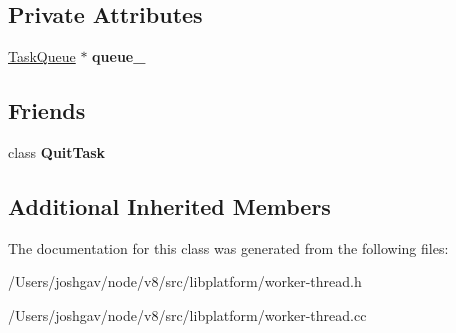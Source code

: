\subsection*{Private Attributes}
\begin{DoxyCompactItemize}
\item 
\hyperlink{classv8_1_1platform_1_1_task_queue}{Task\+Queue} $\ast$ {\bfseries queue\+\_\+}\hypertarget{classv8_1_1platform_1_1_worker_thread_ac917d7f4d0eba3d10201abacdbde1b68}{}\label{classv8_1_1platform_1_1_worker_thread_ac917d7f4d0eba3d10201abacdbde1b68}

\end{DoxyCompactItemize}
\subsection*{Friends}
\begin{DoxyCompactItemize}
\item 
class {\bfseries Quit\+Task}\hypertarget{classv8_1_1platform_1_1_worker_thread_a371c4e877b93059aff86d43d63c8d70c}{}\label{classv8_1_1platform_1_1_worker_thread_a371c4e877b93059aff86d43d63c8d70c}

\end{DoxyCompactItemize}
\subsection*{Additional Inherited Members}


The documentation for this class was generated from the following files\+:\begin{DoxyCompactItemize}
\item 
/\+Users/joshgav/node/v8/src/libplatform/worker-\/thread.\+h\item 
/\+Users/joshgav/node/v8/src/libplatform/worker-\/thread.\+cc\end{DoxyCompactItemize}
